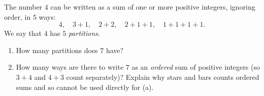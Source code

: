 The number $4$ can be written as a sum of one or more positive integers, ignoring order, in $5$ ways:
\[4,\quad3+1,\quad2+2,\quad2+1+1,\quad1+1+1+1.\]
We say that $4$ has $5$ \emph{partitions}.
\begin{enumerate}
\item[(a)] How many partitions does $7$ have?
\item[(b)] How many ways are there to write $7$ as an \emph{ordered} sum of positive integers (so $3+4$ and $4+3$ count separately)? Explain why stars and bars counts ordered sums and so cannot be used directly for (a).
\end{enumerate}

